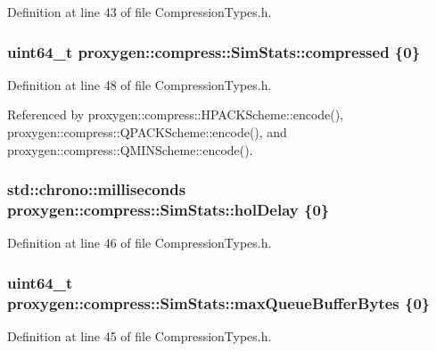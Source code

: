 Definition at line 43 of file Compression\+Types.\+h.

\subsubsection[{compressed}]{\setlength{\rightskip}{0pt plus 5cm}uint64\+\_\+t proxygen\+::compress\+::\+Sim\+Stats\+::compressed \{0\}}\label{structproxygen_1_1compress_1_1SimStats_a5cf35c268868a68c901e6282f5efd158}


Definition at line 48 of file Compression\+Types.\+h.



Referenced by proxygen\+::compress\+::\+H\+P\+A\+C\+K\+Scheme\+::encode(), proxygen\+::compress\+::\+Q\+P\+A\+C\+K\+Scheme\+::encode(), and proxygen\+::compress\+::\+Q\+M\+I\+N\+Scheme\+::encode().

\subsubsection[{hol\+Delay}]{\setlength{\rightskip}{0pt plus 5cm}std\+::chrono\+::milliseconds proxygen\+::compress\+::\+Sim\+Stats\+::hol\+Delay \{0\}}\label{structproxygen_1_1compress_1_1SimStats_a79ab4a5373197e07c1869f6e7d8fe518}


Definition at line 46 of file Compression\+Types.\+h.

\subsubsection[{max\+Queue\+Buffer\+Bytes}]{\setlength{\rightskip}{0pt plus 5cm}uint64\+\_\+t proxygen\+::compress\+::\+Sim\+Stats\+::max\+Queue\+Buffer\+Bytes \{0\}}\label{structproxygen_1_1compress_1_1SimStats_af398c13ba74d5502e5b5e8407309f67c}


Definition at line 45 of file Compression\+Types.\+h.



